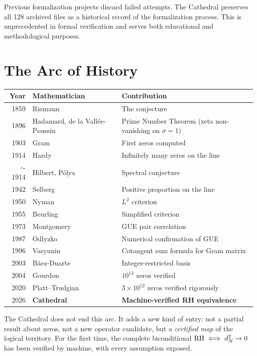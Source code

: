 \documentclass[11pt,a4paper]{article}
\begin{document}
Previous formalization projects discard failed attempts. The
Cathedral preserves all 128 archived files as a historical record
of the formalization process. This is unprecedented in formal
verification and serves both educational and methodological
purposes.

\section{The Arc of History}

\begin{center}
\small
\begin{tabular}{@{}rlp{7cm}@{}}
\toprule
\textbf{Year} & \textbf{Mathematician} & \textbf{Contribution} \\
\midrule
1859 & Riemann & The conjecture \\
1896 & Hadamard, de la Vall\'ee-Poussin & Prime Number Theorem
  (zeta non-vanishing on $\sigma = 1$) \\
1903 & Gram & First zeros computed \\
1914 & Hardy & Infinitely many zeros on the line \\
$\sim$1914 & Hilbert, P\'olya & Spectral conjecture \\
1942 & Selberg & Positive proportion on the line \\
1950 & Nyman & $L^2$ criterion \\
1955 & Beurling & Simplified criterion \\
1973 & Montgomery & GUE pair correlation \\
1987 & Odlyzko & Numerical confirmation of GUE \\
1996 & Vasyunin & Cotangent sum formula for Gram matrix \\
2003 & B\'aez-Duarte & Integer-restricted basis \\
2004 & Gourdon & $10^{13}$ zeros verified \\
2020 & Platt--Trudgian & $3 \times 10^{12}$ zeros verified
  rigorously \\
2026 & \textbf{Cathedral} & \textbf{Machine-verified RH equivalence} \\
\bottomrule
\end{tabular}
\end{center}

The Cathedral does not end this arc. It adds a new kind of entry:
not a partial result about zeros, not a new operator candidate,
but a \emph{certified map} of the logical territory. For the first
time, the complete biconditional $\mathrm{RH} \iff d_N^2 \to 0$ has been
verified by machine, with every assumption exposed.
\end{document}
